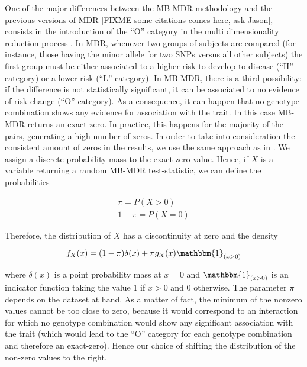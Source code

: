 \documentclass{bmcart}
\begin{document}
One of the major differences between the MB-MDR methodology and the previous versions of MDR [FIXME some citations comes here, ask Jason], consists in the introduction of the ``O'' category in the multi dimensionality reduction process \cite{Calle2008,Cattaert2011}. In MDR, whenever two groups of subjects are compared (for instance, those having the minor allele for two SNPs versus all other subjects) the first group must be either associated to a higher risk to develop to disease (``H'' category) or a lower risk (``L'' category). In MB-MDR, there is a third possibility: if the difference is not statistically significant, it can be associated to no evidence of risk change (``O'' category). As a consequence, it can happen that no genotype combination shows any evidence for association with the trait. In this case MB-MDR returns an exact zero. In practice, this happens for the majority of the pairs, generating a high number of zeros. In order to take into consideration the consistent amount of zeros in the results, we use the same approach as in \cite{Hautsch2013}. We assign a discrete probability mass to the exact zero value. Hence, if $X$ is a variable returning a random MB-MDR test-statistic, we can define the probabilities 

\begin{eqnarray*}
\pi = P(X > 0) \\
1-\pi = P(X = 0) 
\end{eqnarray*}

Therefore, the distribution of $X$ has a discontinuity at zero and the density 

\begin{equation}
f_X(x) = (1-\pi) \delta(x) + \pi g_X(x) \mathbbm{1}_{(x>0)}
\end{equation}


where $\delta(x)$ is a point probability mass at $x=0$ and $\mathbbm{1}_{(x>0)}$ is an indicator function taking the value 1 if $x>0$ and 0 otherwise. 
The parameter $\pi$ depends on the dataset at hand. As a matter of fact, the minimum of the nonzero values cannot be too close to zero, because it would correspond to an interaction for which no genotype combination would show any significant association with the trait (which would lead to the ``O'' category for each genotype combination and therefore an exact-zero). Hence our choice of shifting the distribution of the non-zero values to the right.
\end{document}
